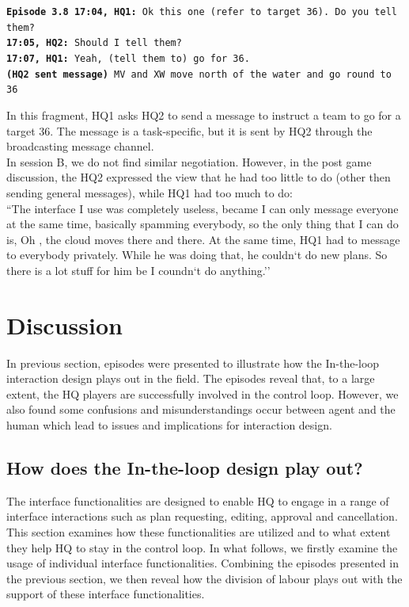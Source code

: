 \noindent\texttt{\textbf{Episode 3.8 }
\textbf{17:04, HQ1: } Ok this one (refer to target 36). Do you tell them? \\
\textbf{17:05, HQ2: } Should I tell them? \\
\textbf{17:07, HQ1: } Yeah, (tell them to) go for 36. \\
\textbf{(HQ2 sent message) } MV and XW  move north of the water and go round to 36\\
}

In this fragment, HQ1 asks HQ2 to send a message to instruct a team to go for a target 36. The message is a task-specific, but it is sent by HQ2 through the broadcasting message channel.\\

In session B, we do not find similar negotiation. However, in the post game discussion, the HQ2 expressed the view that he had too little to do (other then sending general messages), while HQ1 had too much to do:\\

``The interface I use was completely useless, became I can only message everyone at the same time, basically spamming everybody, so the only thing that I can do is, Oh , the cloud moves there and there. At the same time, HQ1 had to message to everybody privately. While he was doing that, he couldn`t do new plans. So there is a lot stuff for him be I coundn`t do anything.''\\

\section{Discussion}\label{sec:study3discussion}

In previous section, episodes were presented to illustrate how the In-the-loop interaction design plays out in the field.  The episodes reveal that, to a large extent, the HQ players are successfully involved in the control loop. However, we also found some confusions and misunderstandings occur between agent and the human which lead to issues and implications for interaction design.  \\

\subsection{How does the In-the-loop design play out?}
The interface functionalities are designed to enable HQ to engage in a range of interface interactions such as plan requesting, editing, approval and cancellation. This section examines how these functionalities are utilized and to what extent they help HQ to stay in the control loop. In what follows, we firstly examine the usage of individual interface functionalities. Combining the episodes presented in the previous section, we then reveal how the division of labour plays out with the support of these interface functionalities.  \\

